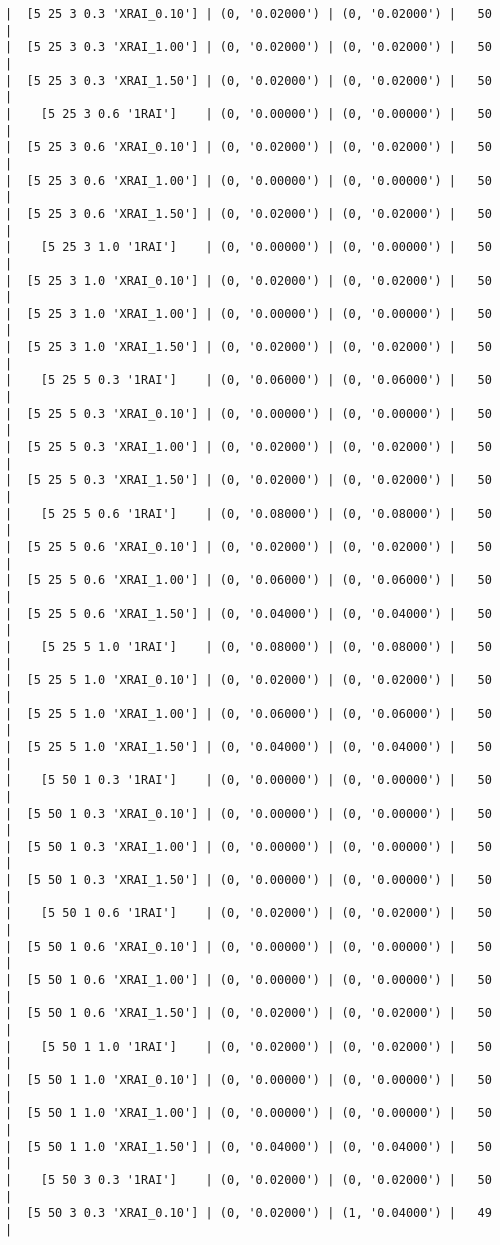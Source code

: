 \documentclass{article}
\begin{document}
\begin{verbatim}
|  [5 25 3 0.3 'XRAI_0.10'] | (0, '0.02000') | (0, '0.02000') |   50  |
|  [5 25 3 0.3 'XRAI_1.00'] | (0, '0.02000') | (0, '0.02000') |   50  |
|  [5 25 3 0.3 'XRAI_1.50'] | (0, '0.02000') | (0, '0.02000') |   50  |
|    [5 25 3 0.6 '1RAI']    | (0, '0.00000') | (0, '0.00000') |   50  |
|  [5 25 3 0.6 'XRAI_0.10'] | (0, '0.02000') | (0, '0.02000') |   50  |
|  [5 25 3 0.6 'XRAI_1.00'] | (0, '0.00000') | (0, '0.00000') |   50  |
|  [5 25 3 0.6 'XRAI_1.50'] | (0, '0.02000') | (0, '0.02000') |   50  |
|    [5 25 3 1.0 '1RAI']    | (0, '0.00000') | (0, '0.00000') |   50  |
|  [5 25 3 1.0 'XRAI_0.10'] | (0, '0.02000') | (0, '0.02000') |   50  |
|  [5 25 3 1.0 'XRAI_1.00'] | (0, '0.00000') | (0, '0.00000') |   50  |
|  [5 25 3 1.0 'XRAI_1.50'] | (0, '0.02000') | (0, '0.02000') |   50  |
|    [5 25 5 0.3 '1RAI']    | (0, '0.06000') | (0, '0.06000') |   50  |
|  [5 25 5 0.3 'XRAI_0.10'] | (0, '0.00000') | (0, '0.00000') |   50  |
|  [5 25 5 0.3 'XRAI_1.00'] | (0, '0.02000') | (0, '0.02000') |   50  |
|  [5 25 5 0.3 'XRAI_1.50'] | (0, '0.02000') | (0, '0.02000') |   50  |
|    [5 25 5 0.6 '1RAI']    | (0, '0.08000') | (0, '0.08000') |   50  |
|  [5 25 5 0.6 'XRAI_0.10'] | (0, '0.02000') | (0, '0.02000') |   50  |
|  [5 25 5 0.6 'XRAI_1.00'] | (0, '0.06000') | (0, '0.06000') |   50  |
|  [5 25 5 0.6 'XRAI_1.50'] | (0, '0.04000') | (0, '0.04000') |   50  |
|    [5 25 5 1.0 '1RAI']    | (0, '0.08000') | (0, '0.08000') |   50  |
|  [5 25 5 1.0 'XRAI_0.10'] | (0, '0.02000') | (0, '0.02000') |   50  |
|  [5 25 5 1.0 'XRAI_1.00'] | (0, '0.06000') | (0, '0.06000') |   50  |
|  [5 25 5 1.0 'XRAI_1.50'] | (0, '0.04000') | (0, '0.04000') |   50  |
|    [5 50 1 0.3 '1RAI']    | (0, '0.00000') | (0, '0.00000') |   50  |
|  [5 50 1 0.3 'XRAI_0.10'] | (0, '0.00000') | (0, '0.00000') |   50  |
|  [5 50 1 0.3 'XRAI_1.00'] | (0, '0.00000') | (0, '0.00000') |   50  |
|  [5 50 1 0.3 'XRAI_1.50'] | (0, '0.00000') | (0, '0.00000') |   50  |
|    [5 50 1 0.6 '1RAI']    | (0, '0.02000') | (0, '0.02000') |   50  |
|  [5 50 1 0.6 'XRAI_0.10'] | (0, '0.00000') | (0, '0.00000') |   50  |
|  [5 50 1 0.6 'XRAI_1.00'] | (0, '0.00000') | (0, '0.00000') |   50  |
|  [5 50 1 0.6 'XRAI_1.50'] | (0, '0.02000') | (0, '0.02000') |   50  |
|    [5 50 1 1.0 '1RAI']    | (0, '0.02000') | (0, '0.02000') |   50  |
|  [5 50 1 1.0 'XRAI_0.10'] | (0, '0.00000') | (0, '0.00000') |   50  |
|  [5 50 1 1.0 'XRAI_1.00'] | (0, '0.00000') | (0, '0.00000') |   50  |
|  [5 50 1 1.0 'XRAI_1.50'] | (0, '0.04000') | (0, '0.04000') |   50  |
|    [5 50 3 0.3 '1RAI']    | (0, '0.02000') | (0, '0.02000') |   50  |
|  [5 50 3 0.3 'XRAI_0.10'] | (0, '0.02000') | (1, '0.04000') |   49  |

\end{verbatim}
\end{document}

